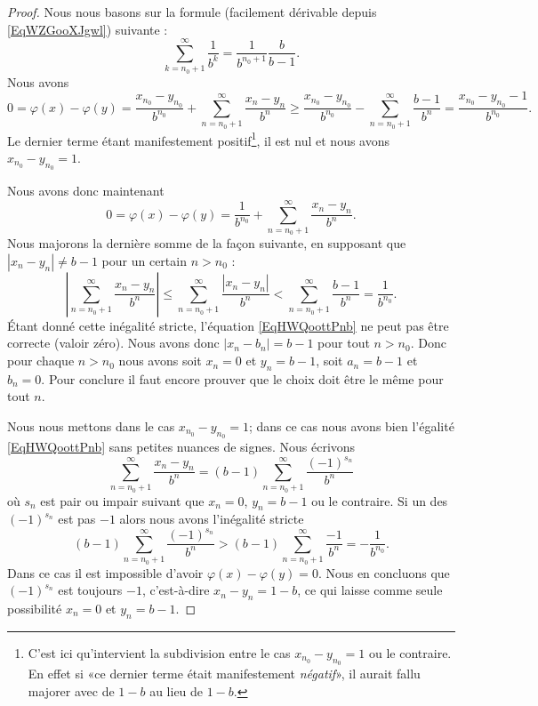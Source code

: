 \begin{proof}
    Nous nous basons sur la formule (facilement dérivable depuis \eqref{EqWZGooXJgwl}) suivante :
    \begin{equation}
        \sum_{k=n_0+1}^{\infty}\frac{1}{ b^k }=\frac{1}{ b^{n_0+1} }\frac{ b }{ b-1 }.
    \end{equation}
    Nous avons
    \begin{equation}
        0=\varphi(x)-\varphi(y)=\frac{ x_{n_0}-y_{n_0} }{ b^{n_0} }+\sum_{n=n_0+1}^{\infty}\frac{ x_n-y_n }{ b^n }\geq \frac{ x_{n_0}-y_{n_0} }{ b^{n_0} }-\sum_{n=n_0+1}^{\infty}\frac{ b-1 }{ b^n }=\frac{ x_{n_0}-y_{n_0}-1 }{ b^{n_0} }.
    \end{equation}
    Le dernier terme étant manifestement positif\footnote{C'est ici qu'intervient la subdivision entre le cas \( x_{n_0}-y_{n_0}=1\) ou le contraire. En effet si «ce dernier terme était manifestement \emph{négatif}», il aurait fallu majorer avec de \( 1-b\) au lieu de \( 1-b\).}, il est nul et nous avons \( x_{n_0}-y_{n_0}=1\).

    Nous avons donc maintenant
    \begin{equation}    \label{EqHWQoottPnb}
        0=\varphi(x)-\varphi(y)=\frac{1}{ b^{n_0} }+\sum_{n=n_0+1}^{\infty}\frac{ x_n-y_n }{ b^n }.
    \end{equation}
    Nous majorons la dernière somme de la façon suivante, en supposant que \( | x_n-y_n |\neq b-1\) pour un certain \( n>n_0\) :
    \begin{equation}
        \left| \sum_{n=n_0+1}^{\infty}\frac{ x_n-y_n }{ b^n } \right| \leq\sum_{n=n_0+1}^{\infty}\frac{ | x_n-y_n | }{ b^n }<\sum_{n=n_0+1}^{\infty}\frac{ b-1 }{ b^n }=\frac{1}{ b^{n_0} }.
    \end{equation}
    Étant donné cette inégalité stricte, l'équation \eqref{EqHWQoottPnb} ne peut pas être correcte (valoir zéro). Nous avons donc \( | x_n-b_n |=b-1\) pour tout \( n>n_0\). Donc pour chaque \( n>n_0\) nous avons soit \( x_n=0\) et \( y_n=b-1\), soit \( a_n=b-1\) et \( b_n=0\). Pour conclure il faut encore prouver que le choix doit être le même pour tout \( n\).

    Nous nous mettons dans le cas \( x_{n_0}-y_{n_0}=1\); dans ce cas nous avons bien l'égalité \eqref{EqHWQoottPnb} sans petites nuances de signes. Nous écrivons
    \begin{equation}
        \sum_{n=n_0+1}^{\infty}\frac{ x_n-y_n }{ b^n }=(b-1)\sum_{n=n_0+1}^{\infty}\frac{ (-1)^{s_n} }{ b^n }
    \end{equation}
    où \( s_n\) est pair ou impair suivant que \( x_n=0\), \( y_n=b-1\) ou le contraire. Si un des \( (-1)^{s_n}\) est pas \( -1\) alors nous avons l'inégalité stricte
    \begin{equation}
        (b-1)\sum_{n=n_0+1}^{\infty}\frac{ (-1)^{s_n} }{ b^n }>(b-1)\sum_{n=n_0+1}^{\infty}\frac{-1}{ b^n }=-\frac{1}{ b^{n_0} }.
    \end{equation}
    Dans ce cas il est impossible d'avoir \( \varphi(x)-\varphi(y)=0\). Nous en concluons que \( (-1)^{s_n}\) est toujours \( -1\), c'est-à-dire \( x_n-y_n=1-b\), ce qui laisse comme seule possibilité \( x_n=0\) et \( y_n=b-1\).
\end{proof}

